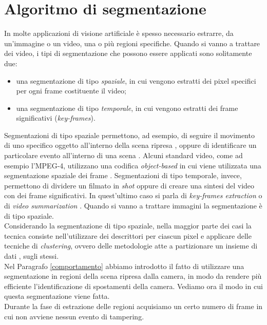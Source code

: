 \section{Algoritmo di segmentazione}
\label{segmentazione}
In molte applicazioni di visione artificiale \`e spesso necessario estrarre, da un'immagine o un video, una o pi\`u regioni specifiche. Quando si vanno a trattare dei video, i tipi di segmentazione che possono essere applicati sono solitamente due:
\begin{itemize}      
	\item una segmentazione di tipo \textit{spaziale}, in cui vengono estratti dei pixel specifici per ogni frame costituente il video;
	\item una segmentazione di tipo \textit{temporale}, in cui vengono estratti dei frame significativi (\textit{key-frames}).
\end{itemize}
Segmentazioni di tipo spaziale permettono, ad esempio, di seguire il movimento di uno specifico oggetto all'interno della scena ripresa \cite{kim2003efficient,kottke1994motion}, oppure di identificare un particolare evento all'interno di una scena \cite{ke2007event}.
Alcuni standard video, come ad esempio l'MPEG-4, utilizzano una codifica \textit{object-based} in cui viene utilizzata una segmentazione spaziale dei frame \cite{deng2001unsupervised}. 
Segmentazioni di tipo temporale, invece, permettono di dividere un filmato in \textit{shot} oppure di creare una sintesi del video con dei frame significativi. In quest'ultimo caso si parla di \textit{key-frames extraction} o di \textit{video summarization} \cite{gong2000video,jiang2009hierarchical,sentinelli2014live,wolf1996key}. Quando si vanno a trattare immagini la segmentazione \`e di tipo spaziale.\\
Considerando la segmentazione di tipo spaziale, nella maggior parte dei casi la tecnica consiste nell'utilizzare dei descrittori per ciascun pixel e applicare delle tecniche di \textit{clustering}, ovvero delle metodologie atte a partizionare un insieme di dati \cite{han2006data}, sugli stessi. \\
Nel Paragrafo \ref{comportamento} abbiamo introdotto il fatto di utilizzare una segmentazione in regioni della scena ripresa dalla camera, in modo da rendere pi\`u efficiente l'identificazione di spostamenti della camera.
Vediamo ora il modo in cui questa segmentazione viene fatta.\\
Durante la fase di estrazione delle regioni acquisiamo un certo numero di frame in cui non avviene nessun evento di tampering.
